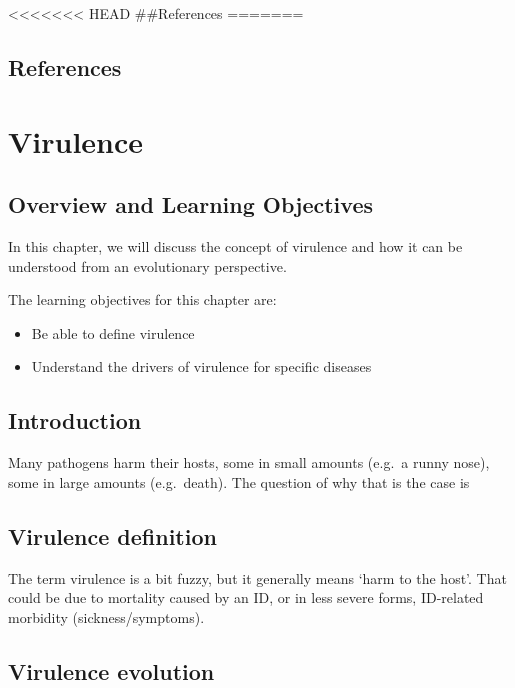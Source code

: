 \documentclass[]{book}
\providecommand{\tightlist}{%
  \setlength{\itemsep}{0pt}\setlength{\parskip}{0pt}}
\theoremstyle{definition}
\theoremstyle{definition}
\theoremstyle{definition}
\theoremstyle{remark}
\begin{document}
<<<<<<< HEAD
\#\#References
=======
\section{References}\label{references-16}

\chapter{Virulence}\label{virulence}

\section{Overview and Learning
Objectives}\label{overview-and-learning-objectives-16}

In this chapter, we will discuss the concept of virulence and how it can
be understood from an evolutionary perspective.

The learning objectives for this chapter are:

\begin{itemize}
\tightlist
\item
  Be able to define virulence
\item
  Understand the drivers of virulence for specific diseases
\end{itemize}

\section{Introduction}\label{introduction-16}

Many pathogens harm their hosts, some in small amounts (e.g.~a runny
nose), some in large amounts (e.g.~death). The question of why that is
the case is

\section{Virulence definition}\label{virulence-definition}

The term virulence is a bit fuzzy, but it generally means `harm to the
host'. That could be due to mortality caused by an ID, or in less severe
forms, ID-related morbidity (sickness/symptoms).

\section{Virulence evolution}\label{virulence-evolution}
\end{document}
